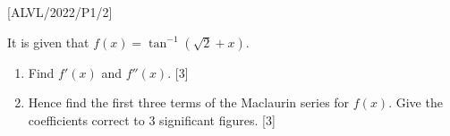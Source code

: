 \item {[}ALVL/2022/P1/2{]}

It is given that $f(x)=\tan^{-1}(\sqrt{2}+x)$.
\begin{enumerate}
\item Find $f'(x)$ and $f''(x)$. \hfill{}{[}3{]}
\item Hence find the first three terms of the Maclaurin series for $f(x)$.
Give the coefficients correct to 3 significant figures. \hfill{}{[}3{]}
\end{enumerate}
